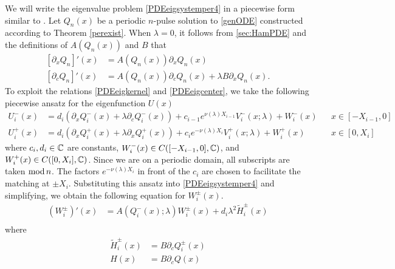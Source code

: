 \documentclass[thesis.tex]{subfiles}
\begin{document}
We will write the eigenvalue problem \cref{PDEeigsystemper4} in a piecewise form similar to \cite{Sandstede1998}. Let $Q_n(x)$ be a periodic $n$-pulse solution to \eqref{genODE} constructed according to Theorem \ref{perexist}. When $\lambda = 0$, it follows from \cref{sec:HamPDE} and the definitions of $A(Q_n(x))$ and $B$ that 
\begin{equation}\label{PDEeigkernel}
\begin{aligned}
{[\partial_x Q_n]}'(x) &= A(Q_n(x))\partial_x Q_n(x) \\
{[\partial_c Q_n]}'(x) &= A(Q_n(x))\partial_c Q_n(x) + \lambda B \partial_x Q_n(x).
\end{aligned}
\end{equation}
To exploit the relations \eqref{PDEeigkernel} and \eqref{PDEeigcenter}, we take the following piecewise ansatz for the eigenfunction $U(x)$
\begin{equation}\label{Vpiecewise}
\begin{aligned}
U_i^-(x) &= d_i (\partial_x Q_i^-(x) + \lambda \partial_c Q_i^-(x)) + c_{i-1} e^{\nu(\lambda)X_{i-1} } V_i^-(x; \lambda) + W_i^-(x) && x \in [-X_{i-1}, 0] \\
U_i^+(x) &= d_i (\partial_x Q_i^+(x) + \lambda \partial_x Q_i^+(x)) + c_i e^{-\nu(\lambda)X_i }V_i^+(x; \lambda) + W_i^+(x) && x \in [0, X_i] 
\end{aligned}
\end{equation}
where $c_i, d_i \in \mathbb{C}$ are constants, $W_i^-(x) \in C([-X_{i-1}, 0], \mathbb{C})$, and $W_i^+(x) \in C([0, X_i], \mathbb{C})$. Since we are on a periodic domain, all subscripts are taken $\mathop\mathrm{mod}\nolimits n$. The factors $e^{-\nu(\lambda)X_i }$ in front of the $c_i$ are chosen to facilitate the matching at $\pm X_i$. Substituting this ansatz into \cref{PDEeigsystemper4} and simplifying, we obtain the following equation for $W_i^\pm(x)$.
\begin{equation}\label{Wipm2}
\begin{aligned}
(W_i^\pm)'(x) &= A(Q_i^-(x); \lambda) W_i^\pm(x) + d_i \lambda^2 \tilde{H}_i^\pm(x) \\
\end{aligned}
\end{equation}
where
\begin{align*}
\tilde{H}_i^\pm(x) &= B \partial_c Q_i^\pm(x) \\ 
H(x) &= B \partial_c Q(x)
\end{align*}
\end{document}
